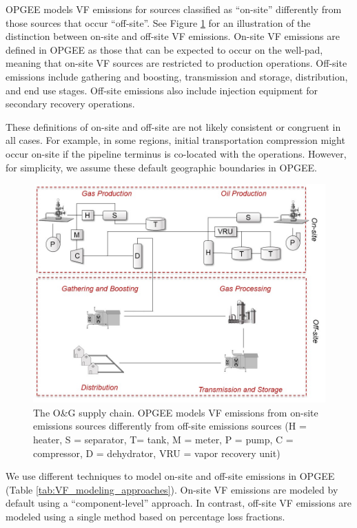 \documentclass[11pt]{report}
\begin{document}
OPGEE models VF emissions for sources classified as ``on-site'' differently from those sources that occur ``off-site''. See Figure \ref{fig:onsite_offsite} for an illustration of the distinction between on-site and off-site VF emissions. On-site VF emissions are defined in OPGEE as those that can be expected to occur on the well-pad, meaning that on-site VF sources are restricted to production operations. Off-site emissions include gathering and boosting, transmission and storage, distribution, and end use stages. Off-site emissions also include injection equipment for secondary recovery operations.

These definitions of on-site and off-site are not likely consistent or congruent in all cases. For example, in some regions, initial transportation compression might occur on-site if the pipeline terminus is co-located with the operations. However, for simplicity, we assume these default geographic boundaries in OPGEE.
 
 
\begin{figure}[t]
\includegraphics[width=0.8\columnwidth]{images/Onsite_offsite.jpg}
\caption{The O\&G supply chain. OPGEE models VF emissions from on-site emissions sources differently from off-site emissions sources (H = heater, S = separator, T= tank, M = meter, P = pump, C = compressor, D = dehydrator, VRU = vapor recovery unit)}
\label{fig:onsite_offsite}
\end{figure}


We use different techniques to model on-site and off-site emissions in OPGEE (Table \ref{tab:VF_modeling_approaches}). On-site VF emissions are modeled by default using a ``component-level'' approach. In contrast, off-site VF emissions are modeled using a single method based on percentage loss fractions. 
\end{document}
